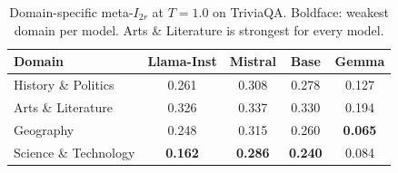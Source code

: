 \begin{table}[t]
\centering
\caption{Domain-specific meta-$I_{2r}$ at $T{=}1.0$ on TriviaQA. Boldface: weakest domain per model. Arts \& Literature is strongest for every model.}
\label{tab:domain}
\small
\begin{tabular}{lcccc}
\toprule
\textbf{Domain} & \textbf{Llama-Inst} & \textbf{Mistral} & \textbf{Base} & \textbf{Gemma} \\
\midrule
History \& Politics & 0.261 & 0.308 & 0.278 & 0.127 \\
Arts \& Literature & 0.326 & 0.337 & 0.330 & 0.194 \\
Geography & 0.248 & 0.315 & 0.260 & \textbf{0.065} \\
Science \& Technology & \textbf{0.162} & \textbf{0.286} & \textbf{0.240} & 0.084 \\
\bottomrule
\end{tabular}
\end{table}